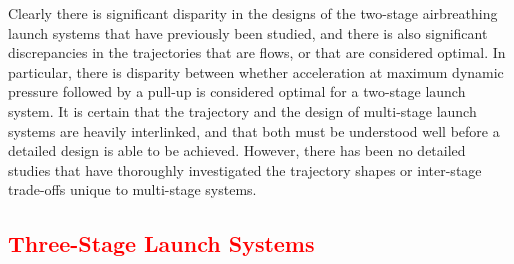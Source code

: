 Clearly there is significant disparity in the designs of the two-stage airbreathing launch systems that have previously been studied, and there is also significant discrepancies in the trajectories that are flows, or that are considered optimal.
In particular, there is disparity between whether acceleration at maximum dynamic pressure followed by a pull-up is considered optimal for a two-stage launch system.
It is certain that the trajectory and the design of multi-stage launch systems are heavily interlinked, and that both must be understood well before a detailed design is able to be achieved. However, there has been no detailed studies that have thoroughly investigated the trajectory shapes or inter-stage trade-offs unique to multi-stage systems. 



  \textcolor{red}{
  \subsection{Three-Stage Launch Systems}
}
	
